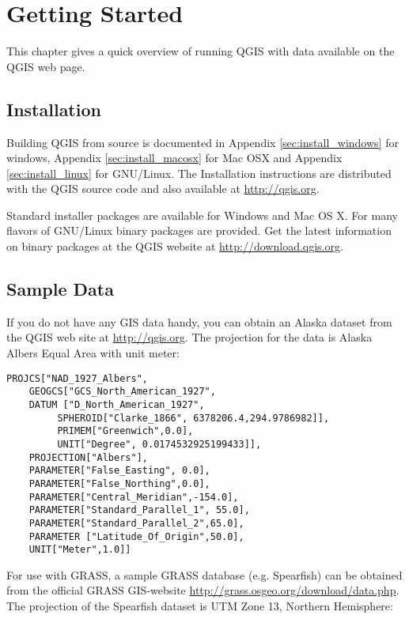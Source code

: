 \section{Getting Started}\label{label_getstarted}

This chapter gives a quick overview of running QGIS with data available on the QGIS web page.

\subsection{Installation}\label{label_installation}

Building QGIS from source is documented in Appendix \ref{sec:install_windows} for windows, 
Appendix \ref{sec:install_macosx} for Mac OSX and Appendix \ref{sec:install_linux} for GNU/Linux. 
The Installation instructions are distributed with the QGIS source code and also available 
at \url{http://qgis.org}. 

Standard installer packages are available for Windows and Mac OS X. For many 
flavors of GNU/Linux binary packages are provided. Get the latest information 
on binary packages at the QGIS website at \url{http://download.qgis.org}.

\subsection{Sample Data}\label{label_sampledata}

If you do not have any GIS data handy, you can obtain an Alaska
dataset from the QGIS web site at \url{http://qgis.org}. The projection 
for the data is Alaska Albers Equal Area with unit meter:

\begin{verbatim}
PROJCS["NAD_1927_Albers",
    GEOGCS["GCS_North_American_1927",
	DATUM ["D_North_American_1927",
	     SPHEROID["Clarke_1866", 6378206.4,294.9786982]],
	     PRIMEM["Greenwich",0.0],
	     UNIT["Degree", 0.0174532925199433]],
    PROJECTION["Albers"],
    PARAMETER["False_Easting", 0.0],
    PARAMETER["False_Northing",0.0],
    PARAMETER["Central_Meridian",-154.0],
    PARAMETER["Standard_Parallel_1", 55.0],
    PARAMETER["Standard_Parallel_2",65.0],
    PARAMETER ["Latitude_Of_Origin",50.0],
    UNIT["Meter",1.0]]
\end{verbatim}

For use with GRASS, a sample GRASS database (e.g. Spearfish) can be obtained 
from the official GRASS GIS-website \url{http://grass.osgeo.org/download/data.php}. 
The projection of the Spearfish dataset is UTM Zone 13, Northern Hemisphere: 

